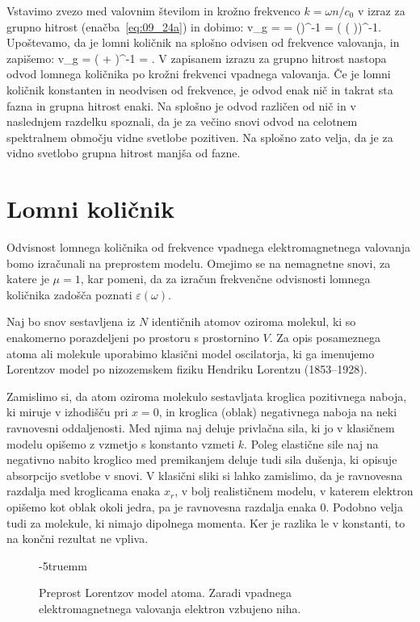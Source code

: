 Vstavimo zvezo med valovnim številom in krožno frekvenco $k=\omega n /c_0$ v izraz za 
grupno hitrost (enačba~\ref{eq:09_24a}) in dobimo:
\beq
v_g =  = \left(\right)^{-1} = \left( \left( 
\right)\!\right)^{-1}\!\!.
\label{eq:09_25}
\eeq
Upoštevamo, da je lomni količnik na splošno odvisen od frekvence valovanja, in zapišemo:
\beq
v_g = \left( + \right)^{-1} = 
.
\label{eq:09_26}
\eeq
V zapisanem izrazu za grupno hitrost nastopa odvod lomnega količnika po krožni frekvenci vpadnega
valovanja. Če je lomni količnik konstanten in neodvisen od frekvence, je odvod enak nič in 
takrat sta fazna in grupna hitrost enaki. Na splošno je odvod različen od nič in v naslednjem razdelku
spoznali, da je za večino snovi odvod na celotnem spektralnem območju vidne svetlobe pozitiven.
Na splošno zato velja, da je za vidno svetlobo grupna hitrost manjša od fazne.

\section{Lomni količnik}
\label{chap:lomni}
Odvisnost lomnega količnika od frekvence vpadnega 
elektromagnetnega valovanja bomo izračunali na preprostem modelu. 
Omejimo se na nemagnetne snovi, za katere je $\mu = 1$, kar pomeni, da
za izračun frekvenčne odvisnosti lomnega količnika zadošča poznati 
$\varepsilon(\omega)$. 

Naj bo snov sestavljena iz $N$
identičnih atomov oziroma molekul, ki so enakomerno porazdeljeni
po prostoru s prostornino $V$. Za opis posameznega atoma ali molekule uporabimo 
klasični model oscilatorja, ki ga imenujemo Lorentzov model 
po nizozemskem fiziku Hendriku Lorentzu (1853--1928). 

Zamislimo si, da atom oziroma molekulo sestavljata kroglica 
pozitivnega naboja, ki miruje v izhodišču pri $x=0$, in kroglica
(oblak) negativnega naboja na neki ravnovesni oddaljenosti. Med njima naj 
deluje privlačna sila, ki jo v klasičnem modelu opišemo z vzmetjo
s konstanto vzmeti $k$. 
Poleg elastične sile naj na negativno nabito kroglico med 
premikanjem deluje tudi sila dušenja, ki opisuje absorpcijo svetlobe
v snovi. V klasični sliki si lahko
zamislimo, da je ravnovesna razdalja med kroglicama enaka $x_r$, 
v bolj realističnem modelu, v katerem elektron opišemo kot oblak okoli jedra,
pa je ravnovesna razdalja enaka 0. Podobno velja tudi za molekule, ki 
nimajo dipolnega momenta. Ker je razlika le v konstanti, 
to na končni rezultat ne vpliva.
\begin{figure}[ht]
\centering
\def\svgwidth{60truemm} 

\caption{Preprost Lorentzov model atoma. Zaradi vpadnega 
elektromagnetnega valovanja elektron vzbujeno niha.
}
\label{fig:09_Lorentz}
\vglue-5truemm
\end{figure}

